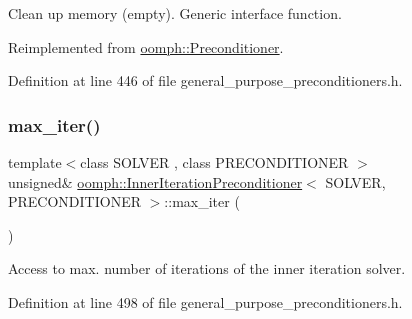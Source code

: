 Clean up memory (empty). Generic interface function. 



Reimplemented from \hyperlink{classoomph_1_1Preconditioner_a46c31c416829bedcd9db238431262027}{oomph\+::\+Preconditioner}.



Definition at line 446 of file general\+\_\+purpose\+\_\+preconditioners.\+h.

\mbox{\label{classoomph_1_1InnerIterationPreconditioner_a83378e18706d5f0da3b7c23a842a0e15}} 
\subsubsection{\texorpdfstring{max\+\_\+iter()}{max\_iter()}}
{\footnotesize\ttfamily template$<$class S\+O\+L\+V\+ER , class P\+R\+E\+C\+O\+N\+D\+I\+T\+I\+O\+N\+ER $>$ \\
unsigned\& \hyperlink{classoomph_1_1InnerIterationPreconditioner}{oomph\+::\+Inner\+Iteration\+Preconditioner}$<$ S\+O\+L\+V\+ER, P\+R\+E\+C\+O\+N\+D\+I\+T\+I\+O\+N\+ER $>$\+::max\+\_\+iter (\begin{DoxyParamCaption}{ }\end{DoxyParamCaption})\hspace{0.3cm}{\ttfamily [inline]}}



Access to max. number of iterations of the inner iteration solver. 



Definition at line 498 of file general\+\_\+purpose\+\_\+preconditioners.\+h.

\mbox{\label{classoomph_1_1InnerIterationPreconditioner_ad60bf4f1a13d4cd0120b9adf6fc96d13}} 
